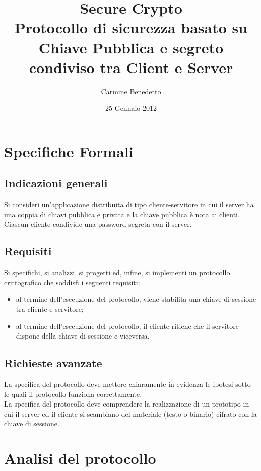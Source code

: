 \documentclass[12pt, a4paper]{article}
\title{Secure Crypto\\
Protocollo di sicurezza basato su Chiave Pubblica e segreto condiviso tra Client e Server}
\author{Carmine Benedetto}
\date{25 Gennaio 2012}
\begin{document}
\maketitle
\newpage
\tableofcontents
\newpage 
\section{Specifiche Formali}
\subsection{Indicazioni generali}
Si consideri un'applicazione distribuita di tipo cliente-servitore in cui il server ha una coppia di chiavi pubblica e privata e la chiave pubblica è nota ai clienti.\\
Ciascun cliente condivide una password segreta con il server.
\subsection{Requisiti}
Si specifichi, si analizzi, si progetti ed, infine, si implementi un protocollo crittografico che soddisfi i seguenti requisiti:
\begin{itemize}
\item 
al termine dell'esecuzione del protocollo, viene stabilita una chiave di sessione tra cliente e servitore;
\item
al termine dell'esecuzione del protocollo, il cliente ritiene che il servitore dispone della chiave di sessione e viceversa. 
\end{itemize}
\subsection{Richieste avanzate}
La specifica del protocollo deve mettere chiaramente in evidenza le ipotesi sotto le quali il protocollo funziona correttamente.\\
La specifica del protocollo deve comprendere la realizzazione di un prototipo in cui il server ed il cliente si scambiano del materiale (testo o binario) cifrato con la chiave di sessione.
\newpage
\section{Analisi del protocollo}
\end{document}
